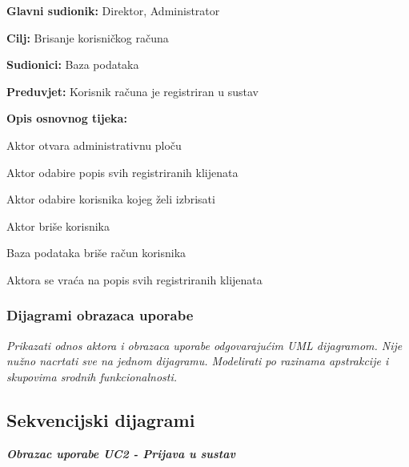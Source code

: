 					\noindent {}
					\begin{packed_item}
						
						\item \textbf{Glavni sudionik: }Direktor, Administrator
						\item  \textbf{Cilj:} Brisanje korisničkog računa
						\item  \textbf{Sudionici:} Baza podataka
						\item  \textbf{Preduvjet:} Korisnik računa je registriran u sustav
						\item  \textbf{Opis osnovnog tijeka:}
						
						\item[] \begin{packed_enum}
							
							\item Aktor otvara administrativnu ploču
							\item Aktor odabire popis svih registriranih klijenata
							\item Aktor odabire korisnika kojeg želi izbrisati
							\item Aktor briše korisnika
							\item Baza podataka briše račun korisnika
							\item Aktora se vraća na popis svih registriranih klijenata
							\end{packed_enum}
						
					\end{packed_item}
					
				\subsubsection{Dijagrami obrazaca uporabe}
					
					\textit{Prikazati odnos aktora i obrazaca uporabe odgovarajućim UML dijagramom. Nije nužno nacrtati sve na jednom dijagramu. Modelirati po razinama apstrakcije i skupovima srodnih funkcionalnosti.}
				\eject		
				
			\subsection{Sekvencijski dijagrami}
				
				\textbf{\textit{Obrazac uporabe UC2 - Prijava u sustav}}\\
				
